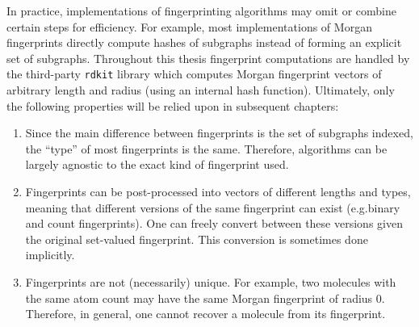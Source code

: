 In practice, implementations of fingerprinting algorithms may omit or combine certain steps for efficiency.
For example, most implementations of Morgan fingerprints directly compute hashes of subgraphs instead of forming
an explicit set of subgraphs.
Throughout this thesis fingerprint computations are handled by the third-party \texttt{rdkit} library
which computes Morgan fingerprint vectors of arbitrary length and radius (using an internal hash function).
Ultimately, only the following properties will be relied upon in subsequent chapters:
\begin{enumerate}
    \item Since the main difference between fingerprints is the set of subgraphs indexed, the ``type'' of most fingerprints is the same.
        Therefore, algorithms can be largely agnostic to the exact kind of fingerprint used.
    \item Fingerprints can be post-processed into vectors of different lengths and types, meaning that different versions of the same fingerprint can exist
        (e.g.\@ binary and count fingerprints).
        One can freely convert between these versions given the original set-valued fingerprint.
        This conversion is sometimes done implicitly.
    \item Fingerprints are not (necessarily) unique. For example, two molecules with the same atom count may have the same Morgan fingerprint of radius $0$.
        Therefore, in general, one cannot recover a molecule from its fingerprint.
\end{enumerate}
